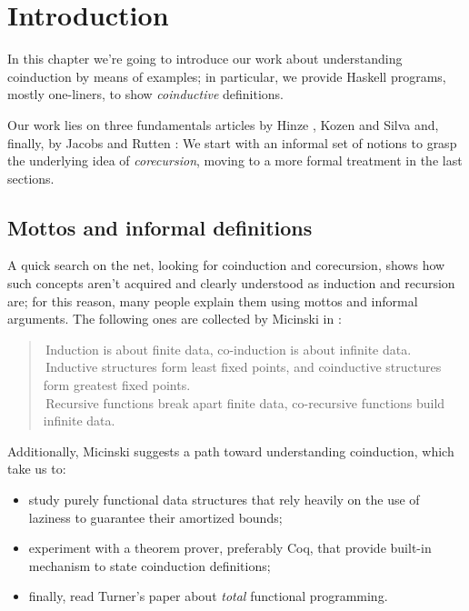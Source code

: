 
\chapter{Introduction}

In this chapter we're going to introduce our work about
understanding coinduction by means of examples; in particular,
we provide Haskell programs, mostly one-liners, to show 
\emph{coinductive} definitions. 

Our work lies on three fundamentals articles by Hinze \cite{Hinze},
Kozen and Silva \cite{Kozen:Silva} and, finally, by Jacobs and Rutten
\cite{jacobs:rutten}: We start with an informal set of notions to 
grasp the underlying idea of \emph{corecursion}, moving to a more 
formal treatment in the last sections. 

\section{Mottos and informal definitions}

A quick search on the net, looking for coinduction and corecursion, 
shows how such concepts aren't acquired and clearly understood as induction and
recursion are; for this reason, many people explain them using mottos 
and informal arguments. The following ones are collected by Micinski 
in \cite{micinski}:
\begin{quote}
    \guillemotleft\,Induction is about finite data, 
        co-induction is about infinite data.\guillemotright\\
    \guillemotleft\,Inductive structures form least fixed points, 
        and coinductive structures form greatest fixed points.\guillemotright\\
    \guillemotleft\,Recursive functions break apart finite data, 
        co-recursive functions build infinite data.\guillemotright
\end{quote}
Additionally, Micinski suggests a path toward understanding coinduction, which
take us to:
\begin{itemize}
    \item study purely functional data structures that rely heavily on the 
        use of laziness to guarantee their amortized bounds;
    \item experiment with a theorem prover, preferably Coq, that provide
        built-in mechanism to state coinduction definitions;
    \item finally, read Turner's paper \cite{turner} about \emph{total} functional
        programming.
\end{itemize}

